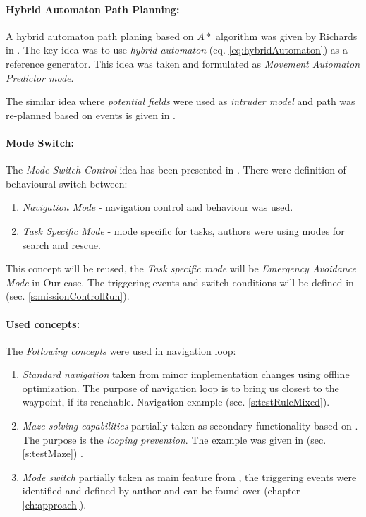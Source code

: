 \paragraph{Hybrid Automaton Path Planning:} A hybrid automaton path planing based on $A*$ algorithm was given by Richards in \cite{richards2004hybrid}. The key idea was to use \emph{hybrid automaton} (eq. \ref{eq:hybridAutomaton}) as a reference generator. This idea was taken and formulated as \emph{Movement Automaton Predictor mode}. 

The similar idea where \emph{potential fields} were used as \emph{intruder model} and path was re-planned  based on events is given in \cite{dong2011hybrid}.

\paragraph{Mode Switch:} The \emph{Mode Switch Control} idea has been presented in \cite{ryan2005mode}. There were definition of behavioural switch between:
\begin{enumerate}
    \item \emph{Navigation Mode} - navigation control and behaviour was used.
    \item \emph{Task Specific Mode} - mode specific for tasks, authors were using modes for search and rescue. 
\end{enumerate}

This concept will be reused, the \emph{Task specific mode} will be \emph{Emergency Avoidance Mode} in Our case. The triggering events and switch conditions will be defined in (sec. \ref{s:missionControlRun}).

\paragraph{Used concepts:} The \emph{Following concepts} were used in navigation loop:
\begin{enumerate}
    \item \emph{Standard navigation} taken from \cite{gardi2018multi} minor implementation changes using offline optimization. The purpose of navigation loop is to bring us closest to the waypoint, if its reachable. Navigation example (sec. \ref{s:testRuleMixed}).
    
    \item \emph{Maze solving capabilities} partially taken as secondary functionality based on \cite{elshamarka2012design}. The purpose is the \emph{looping prevention}. The example was given in (sec. \ref{s:testMaze}) .
    
    \item \emph{Mode switch} partially taken as main feature from \cite{ryan2005mode}, the triggering events were identified and defined by author and can be found over (chapter \ref{ch:approach}).
\end{enumerate}


